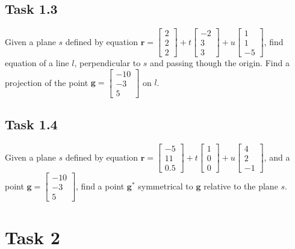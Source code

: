 \documentclass[12pt]{article}%
\begin{document}
\subsection{Task 1.3}

Given a plane $s$ defined by equation 
$\mathbf{r} = 
\begin{bmatrix} 2 \\ 2 \\ 2 \end{bmatrix} + 
t \begin{bmatrix} -2 \\ 3 \\ 3 \end{bmatrix} + 
u \begin{bmatrix} 1 \\ 1 \\ -5 \end{bmatrix}$, find equation of a line $l$, perpendicular to $s$ and passing though the origin. Find a projection of the point $\mathbf{g} = \begin{bmatrix} -10 \\ -3 \\ 5 \end{bmatrix}$ on $l$.


\subsection{Task 1.4}

Given a plane $s$ defined by equation 
$\mathbf{r} = 
\begin{bmatrix} -5 \\ 11 \\ 0.5 \end{bmatrix} + 
t \begin{bmatrix} 1 \\ 0 \\ 0 \end{bmatrix} + 
u \begin{bmatrix} 4 \\ 2 \\ -1 \end{bmatrix}$, and a point $\mathbf{g} = \begin{bmatrix} -10 \\ -3 \\ 5 \end{bmatrix}$, find a point $\mathbf{g}^*$ symmetrical to $\mathbf{g}$ relative to the plane $s$.



\section{Task 2}
\end{document}
